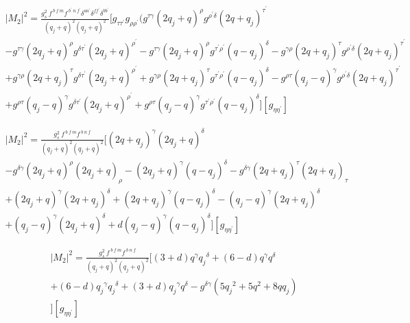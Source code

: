 \begin{equation}
\begin{split}
|M_2|^2=\frac{g_s^2\: f^{\:b\:f\:m} f^{\:b^{\prime}\:n\:f^{\prime}} {\delta}^{{a}{a^{\prime}}} {\delta}^{{f}{f^{\prime}}} {\delta}^{{b}{b^{\prime}}}}{(q_j +q)^2 (q_j +q)^2}[g_{{\tau}{{\tau}^{\prime}}}g_{{\rho}{{\rho}^{\prime}}}(g^{{\tau}{\gamma}}(2q_j+q)^{\rho}g^{{{\rho}^{\prime}}{{\delta}}}(2q+q_j)^{{\tau}^{\prime}}\\
-g^{{\tau}{\gamma}}(2q_j+q)^{\rho}g^{{{\delta}}{{\tau}^{\prime}}}(2q_j +q)^{{\rho}^{\prime}}-g^{{\tau}{\gamma}}(2q_j+q)^{\rho}g^{{{\tau}^{\prime}}{{\rho}^{\prime}}}(q-q_j)^{{\delta}}-g^{{\gamma}{\rho}}(2q +q_j)^{\tau}g^{{{\rho}^{\prime}}{{\delta}}}(2q+q_j)^{{\tau}^{\prime}}\\
+g^{{\gamma}{\rho}}(2q +q_j)^{\tau}g^{{{\delta}}{{\tau}^{\prime}}}(2q_j +q)^{{\rho}^{\prime}}+g^{{\gamma}{\rho}}(2q +q_j)^{\tau}g^{{{\tau}^{\prime}}{{\rho}^{\prime}}}(q-q_j)^{{\delta}}-g^{{\rho}{\tau}}(q_j -q)^{\gamma}g^{{{\rho}^{\prime}}{{\delta}}}(2q+q_j)^{{\tau}^{\prime}}\\
+g^{{\rho}{\tau}}(q_j -q)^{\gamma}g^{{{\delta}}{{\tau}^{\prime}}}(2q_j +q)^{{\rho}^{\prime}}
+g^{{\rho}{\tau}}(q_j -q)^{\gamma}g^{{{\tau}^{\prime}}{{\rho}^{\prime}}}(q-q_j)^{{\delta}}
][g_{{\eta}{{\eta}^{\prime}}}]
\end{split}
\end{equation}


\begin{equation}
\begin{split}
|M_2|^2=\frac{g_s^2\: f^{\:b\:f\:m} f^{\:b\:n\:f}}{(q_j +q)^2 (q_j +q)^2}[(2q+q_j)^{{\gamma}}(2q_j+q)^{\delta}\\
-g^{{\delta}{\gamma}}(2q_j+q)^{\rho}(2q_j +q)_{{\rho}}-(2q_j+q)^{\gamma}(q-q_j)^{{\delta}}-g^{{\delta}{\gamma}}(2q +q_j)^{\tau}(2q+q_j)_{{\tau}}\\
+(2q_j +q)^{{\gamma}}(2q +q_j)^{\delta}+(2q +q_j)^{\gamma}(q-q_j)^{{\delta}}-(q_j -q)^{\gamma}(2q+q_j)^{{\delta}}\\
+(q_j -q)^{\gamma}(2q_j +q)^{{\delta}}+d(q_j -q)^{\gamma}(q-q_j)^{{\delta}}][g_{{\eta}{{\eta}^{\prime}}}]
\end{split}
\end{equation}


\begin{equation}
\begin{split}
|M_2|^2=\frac{g_s^2\: f^{\:b\:f\:m} f^{\:b\:n\:f}}{(q_j +q)^2 (q_j +q)^2}[(3+d)q^{\gamma}{q_j}^{\delta}+(6-d)q^{\gamma}{q}^{\delta}\\+(6-d){q_j}^{\gamma}{q_j}^{\delta}+(3+d){q_j}^{\gamma}{q}^{\delta}-g^{{\delta}{\gamma}}(5{q_j}^2+5q^2+8qq_j)\\
][g_{{\eta}{{\eta}^{\prime}}}]
\end{split}
\end{equation}
\pagebreak

